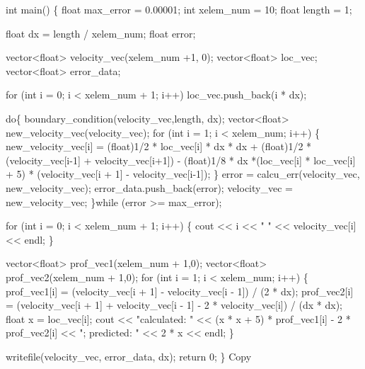 \documentclass[
]{article}
\newenvironment{Shaded}{}{}
\newcommand{\NormalTok}[1]{#1}
\begin{document}
\begin{Shaded}
\begin{Highlighting}[]
\NormalTok{int main()}
\NormalTok{\{}
\NormalTok{    float max\_error = 0.00001;}
\NormalTok{    int xelem\_num = 10; }
\NormalTok{    float length = 1; }
    
\NormalTok{    float dx = length / xelem\_num;}
\NormalTok{    float error;}
    
\NormalTok{    vector\textless{}float\textgreater{} velocity\_vec(xelem\_num +1, 0);}
\NormalTok{    vector\textless{}float\textgreater{} loc\_vec;}
\NormalTok{    vector\textless{}float\textgreater{} error\_data;}
    
\NormalTok{    for (int i = 0; i \textless{} xelem\_num + 1; i++) loc\_vec.push\_back(i * dx);}
    
\NormalTok{    do\{}
\NormalTok{        boundary\_condition(velocity\_vec,length, dx);}
\NormalTok{        vector\textless{}float\textgreater{} new\_velocity\_vec(velocity\_vec);}
\NormalTok{        for (int i = 1; i \textless{} xelem\_num; i++) \{}
\NormalTok{            new\_velocity\_vec[i] = (float)1/2 * loc\_vec[i] * dx * dx }
\NormalTok{            + (float)1/2 * (velocity\_vec[i{-}1] + velocity\_vec[i+1]) }
\NormalTok{            {-} (float)1/8 * dx *(loc\_vec[i] * loc\_vec[i] + 5) * (velocity\_vec[i + 1] {-} velocity\_vec[i{-}1]);}
\NormalTok{        \}}
\NormalTok{        error = calcu\_err(velocity\_vec, new\_velocity\_vec);}
\NormalTok{        error\_data.push\_back(error);}
\NormalTok{        velocity\_vec = new\_velocity\_vec;}
\NormalTok{    \}while (error \textgreater{}= max\_error);}
    
\NormalTok{    for (int i = 0; i \textless{} xelem\_num + 1; i++) \{}
\NormalTok{        cout \textless{}\textless{} i \textless{}\textless{} " " \textless{}\textless{} velocity\_vec[i] \textless{}\textless{} endl;}
\NormalTok{    \}}
    
\NormalTok{    vector\textless{}float\textgreater{} prof\_vec1(xelem\_num + 1,0);}
\NormalTok{    vector\textless{}float\textgreater{} prof\_vec2(xelem\_num + 1,0);}
\NormalTok{    for (int i = 1; i \textless{} xelem\_num; i++) \{}
\NormalTok{        prof\_vec1[i] = (velocity\_vec[i + 1] {-} velocity\_vec[i {-} 1]) / (2 * dx);}
\NormalTok{        prof\_vec2[i] = (velocity\_vec[i + 1] + velocity\_vec[i {-} 1] {-} 2 * velocity\_vec[i]) / (dx * dx);}
\NormalTok{        float x = loc\_vec[i];}
\NormalTok{        cout \textless{}\textless{} "calculated: " \textless{}\textless{} (x * x + 5) * prof\_vec1[i] {-} 2 * prof\_vec2[i] \textless{}\textless{} ";  predicted: " \textless{}\textless{} 2 * x \textless{}\textless{} endl;}
\NormalTok{    \}}
    
\NormalTok{    writefile(velocity\_vec, error\_data, dx);}
\NormalTok{    return 0;}
\NormalTok{\}}
\NormalTok{Copy}
\end{Highlighting}
\end{Shaded}
\end{document}
